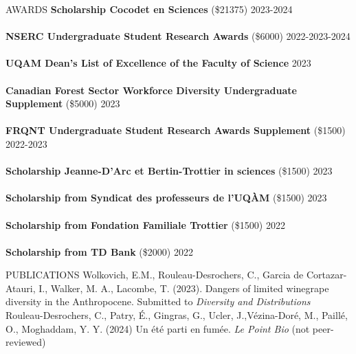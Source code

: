 \documentclass[
	11pt, %
]{resume} %
\begin{document}
\begin{rSection}{AWARDS}	
	\textbf{Scholarship Cocodet en Sciences} (\$21375) \hfill 2023-2024 \\
	\vspace{-2ex}\\
	\textbf{NSERC Undergraduate Student Research Awards} (\$6000) \hfill 2022-2023-2024 \\ 
	\vspace{-2ex}\\
	\textbf{UQAM Dean’s List of Excellence of the Faculty of Science}  \hfill 2023 \\ 
	\vspace{-2ex}\\
	\textbf{Canadian Forest Sector Workforce Diversity Undergraduate Supplement }(\$5000) \hfill 2023 \\ 
	\vspace{-2ex}\\
	\textbf{FRQNT Undergraduate Student Research Awards Supplement} (\$1500) \hfill 2022-2023\\ 
	\vspace{-2ex}\\
	\textbf{Scholarship Jeanne-D'Arc et Bertin-Trottier in sciences} (\$1500) \hfill 2023 \\ 
	\vspace{-2ex}\\
	\textbf{Scholarship from Syndicat des professeurs de l'UQÀM} (\$1500) \hfill 2023 \\ 
	\vspace{-2ex}\\
	\textbf{Scholarship from Fondation Familiale Trottier} (\$1500) \hfill 2022 \\ 
	\vspace{-2ex}\\
	\textbf{Scholarship from TD Bank} (\$2000) \hfill 2022 \\ 
\end{rSection}
\begin{rSection}{PUBLICATIONS}
Wolkovich, E.M., Rouleau-Desrochers, C., Garcia de Cortazar-Atauri, I., Walker, M. A., Lacombe, T. (2023). Dangers of limited winegrape diversity in the Anthropocene. Submitted to \textit{Diversity and Distributions}
	\vspace{1.5ex}\\
Rouleau-Desrochers, C., Patry, É., Gingras, G., Ucler, J.,Vézina-Doré, M., Paillé, O., Moghaddam, Y. Y. (2024) Un été parti en fumée. \textit{Le Point Bio} (not peer-reviewed)
\end{rSection}
\end{document}

